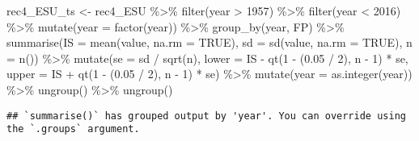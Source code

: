 \documentclass[
]{article}
\newenvironment{Shaded}{\begin{snugshade}}{\end{snugshade}}
\newcommand{\AttributeTok}[1]{\textcolor[rgb]{0.77,0.63,0.00}{#1}}
\newcommand{\ConstantTok}[1]{\textcolor[rgb]{0.00,0.00,0.00}{#1}}
\newcommand{\DecValTok}[1]{\textcolor[rgb]{0.00,0.00,0.81}{#1}}
\newcommand{\FloatTok}[1]{\textcolor[rgb]{0.00,0.00,0.81}{#1}}
\newcommand{\FunctionTok}[1]{\textcolor[rgb]{0.00,0.00,0.00}{#1}}
\newcommand{\NormalTok}[1]{#1}
\newcommand{\OtherTok}[1]{\textcolor[rgb]{0.56,0.35,0.01}{#1}}
\newcommand{\SpecialCharTok}[1]{\textcolor[rgb]{0.00,0.00,0.00}{#1}}
\begin{document}
\begin{Shaded}
\begin{Highlighting}[]
\NormalTok{rec4\_ESU\_ts }\OtherTok{\textless{}{-}}\NormalTok{ rec4\_ESU }\SpecialCharTok{\%\textgreater{}\%} 
  \FunctionTok{filter}\NormalTok{(year }\SpecialCharTok{\textgreater{}} \DecValTok{1957}\NormalTok{) }\SpecialCharTok{\%\textgreater{}\%}
  \FunctionTok{filter}\NormalTok{(year }\SpecialCharTok{\textless{}} \DecValTok{2016}\NormalTok{) }\SpecialCharTok{\%\textgreater{}\%} 
  \FunctionTok{mutate}\NormalTok{(}\AttributeTok{year =} \FunctionTok{factor}\NormalTok{(year)) }\SpecialCharTok{\%\textgreater{}\%} 
  \FunctionTok{group\_by}\NormalTok{(year, FP) }\SpecialCharTok{\%\textgreater{}\%} 
  \FunctionTok{summarise}\NormalTok{(}\AttributeTok{IS =} \FunctionTok{mean}\NormalTok{(value, }\AttributeTok{na.rm =} \ConstantTok{TRUE}\NormalTok{), }
            \AttributeTok{sd =} \FunctionTok{sd}\NormalTok{(value, }\AttributeTok{na.rm =} \ConstantTok{TRUE}\NormalTok{),}
            \AttributeTok{n =} \FunctionTok{n}\NormalTok{()) }\SpecialCharTok{\%\textgreater{}\%}
  \FunctionTok{mutate}\NormalTok{(}\AttributeTok{se =}\NormalTok{ sd }\SpecialCharTok{/} \FunctionTok{sqrt}\NormalTok{(n),}
         \AttributeTok{lower =}\NormalTok{ IS }\SpecialCharTok{{-}} \FunctionTok{qt}\NormalTok{(}\DecValTok{1} \SpecialCharTok{{-}}\NormalTok{ (}\FloatTok{0.05} \SpecialCharTok{/} \DecValTok{2}\NormalTok{), n }\SpecialCharTok{{-}} \DecValTok{1}\NormalTok{) }\SpecialCharTok{*}\NormalTok{ se,}
         \AttributeTok{upper =}\NormalTok{ IS }\SpecialCharTok{+} \FunctionTok{qt}\NormalTok{(}\DecValTok{1} \SpecialCharTok{{-}}\NormalTok{ (}\FloatTok{0.05} \SpecialCharTok{/} \DecValTok{2}\NormalTok{), n }\SpecialCharTok{{-}} \DecValTok{1}\NormalTok{) }\SpecialCharTok{*}\NormalTok{ se) }\SpecialCharTok{\%\textgreater{}\%} 
  \FunctionTok{mutate}\NormalTok{(}\AttributeTok{year =} \FunctionTok{as.integer}\NormalTok{(year)) }\SpecialCharTok{\%\textgreater{}\%} 
\FunctionTok{ungroup}\NormalTok{() }\SpecialCharTok{\%\textgreater{}\%} \FunctionTok{ungroup}\NormalTok{() }
\end{Highlighting}
\end{Shaded}

\begin{verbatim}
## `summarise()` has grouped output by 'year'. You can override using the `.groups` argument.
\end{verbatim}
\end{document}

